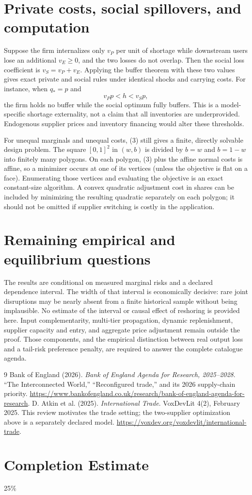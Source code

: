 \documentclass[11pt,a4paper]{article}
\theoremstyle{definition}
\theoremstyle{remark}
\begin{document}
\section{Private costs, social spillovers, and computation}
Suppose the firm internalizes only $v_P$ per unit of shortage while downstream users lose an additional $v_E\ge0$, and the two losses do not overlap. Then the social loss coefficient is $v_S=v_P+v_E$. Applying the buffer theorem with these two values gives exact private and social rules under identical shocks and carrying costs. For instance, when $q_*=p$ and
\[
 v_Pp<h<v_Sp,
\]
the firm holds no buffer while the social optimum fully buffers. This is a model-specific shortage externality, not a claim that all inventories are underprovided. Endogenous supplier prices and inventory financing would alter these thresholds.

For unequal marginals and unequal costs, (3) still gives a finite, directly solvable design problem. The square $[0,1]^2$ in $(w,b)$ is divided by $b=w$ and $b=1-w$ into finitely many polygons. On each polygon, (3) plus the affine normal costs is affine, so a minimizer occurs at one of its vertices (unless the objective is flat on a face). Enumerating those vertices and evaluating the objective is an exact constant-size algorithm. A convex quadratic adjustment cost in shares can be included by minimizing the resulting quadratic separately on each polygon; it should not be omitted if supplier switching is costly in the application.

\section{Remaining empirical and equilibrium questions}
The results are conditional on measured marginal risks and a declared dependence interval. The width of that interval is economically decisive: rare joint disruptions may be nearly absent from a finite historical sample without being implausible. No estimate of the interval or causal effect of reshoring is provided here. Input complementarity, multi-tier propagation, dynamic replenishment, supplier capacity and entry, and aggregate price adjustment remain outside the proof. Those components, and the empirical distinction between real output loss and a tail-risk preference penalty, are required to answer the complete catalogue agenda.
\begin{thebibliography}{9}
 Bank of England (2026).
\emph{Bank of England Agenda for Research, 2025--2028}.
``The Interconnected World,'' ``Reconfigured trade,'' and its 2026 supply-chain priority.
\url{https://www.bankofengland.co.uk/research/bank-of-england-agenda-for-research}.
 D. Atkin et al. (2025). \emph{International Trade}. VoxDevLit 4(2), February 2025. This review motivates the trade setting; the two-supplier optimization above is a separately declared model.
\url{https://voxdev.org/voxdevlit/international-trade}.
\end{thebibliography}

\section{Completion Estimate}
25\%
\end{document}
